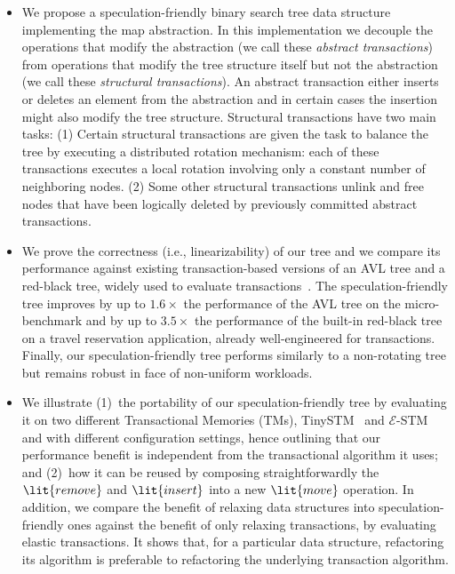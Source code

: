 \begin{itemize}
\item We propose a speculation-friendly binary search tree data structure
implementing the map abstraction.
In this implementation we decouple the operations that modify the abstraction (we call these \emph{abstract transactions}) from operations
that modify the tree structure itself but not the abstraction (we call these \emph{structural transactions}).
An abstract transaction either inserts or deletes an element from the abstraction and 
in certain cases the insertion might also modify the tree structure.
Structural transactions have two main tasks:
(1) Certain structural transactions are given the task to balance the tree 
by executing a distributed rotation mechanism: each of these transactions executes a local rotation involving
only a constant number of neighboring nodes. 
(2) Some other structural transactions unlink and free nodes that have been logically deleted 
by previously committed abstract transactions.

\item We prove the correctness (i.e., linearizability) of our tree and we compare its performance against existing transaction-based versions of an AVL tree and a red-black tree,
widely used to evaluate transactions~\cite{DSS06,HLMS03,CCKO08,HK08,FFR08,YNW+08,DFGG11}.
The speculation-friendly tree improves by up to $1.6\times$ the performance of the AVL tree on the micro-benchmark and 
by up to $3.5\times$ the performance of the built-in red-black tree on a travel reservation application, already well-engineered for transactions.
Finally, our speculation-friendly tree performs similarly to a non-rotating tree but remains robust in face of non-uniform workloads.

\item We illustrate (1)~the portability of our speculation-friendly tree by evaluating it on two different Transactional Memories (TMs), TinySTM~\cite{FFR08} 
and $\mathcal{E}$-STM~\cite{FGG09} and with different configuration settings, hence outlining that our performance benefit is independent 
from the transactional algorithm it uses; and (2)~how it can be reused by composing 
straightforwardly the $\lit{remove}$ and $\lit{insert}$ into a new $\lit{move}$ operation.
In addition, we compare the benefit of relaxing data structures into speculation-friendly ones against the benefit of only relaxing transactions,
by evaluating elastic transactions.
It shows that, for a particular data structure, refactoring its algorithm is preferable to refactoring the underlying transaction algorithm.
\end{itemize}

